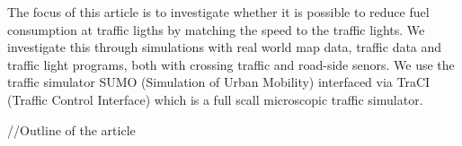 The focus of this article is to investigate whether it is possible to reduce fuel consumption at traffic ligths by matching the speed to the traffic lights. We investigate this through simulations with real world map data, traffic data and traffic light programs, both with crossing traffic and road-side senors. %
We use the traffic simulator SUMO (Simulation of Urban Mobility)\cite{sumo} interfaced via TraCI (Traffic Control Interface)\cite{traci} which is a full scall microscopic traffic simulator.

//Outline of the article





